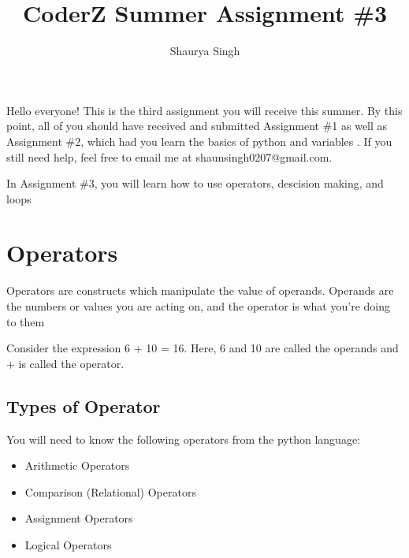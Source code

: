 \documentclass{scrartcl}
\author{Shaurya Singh}
\date{}
\title{CoderZ Summer Assignment \#3}
\begin{document}
\maketitle
\setcounter{tocdepth}{2}
\tableofcontents

Hello everyone! This is the third assignment you will receive this summer. By this
point, all of you should have received and submitted Assignment \#1 as well as
Assignment \#2, which had you learn the basics of python and variables . If you
still need help, feel free to email me at shaunsingh0207@gmail.com.

In Assignment \#3, you will learn how to use
operators, descision making, and loops

\section{Operators}
\label{sec:org5f6c26d}
Operators are constructs which manipulate the value of operands. Operands are
the numbers or values you are acting on, and the operator is what you're doing
to them

Consider the expression 6 + 10 = 16. Here, 6 and 10 are called the operands and + is called the operator.

\subsection{Types of Operator}
\label{sec:org993bed8}
You will need to know the following operators from the python language:
\begin{itemize}
\item Arithmetic Operators
\item Comparison (Relational) Operators
\item Assignment Operators
\item Logical Operators
\end{itemize}
\end{document}
